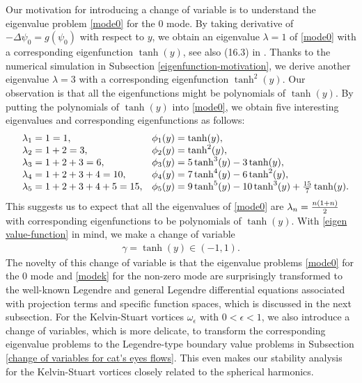 \documentclass[1 [leqno, 11pt]{amsart}
\numberwithin{equation}{section}
\begin{document}
\begin{CJK*}{GBK}{song}
Our motivation for introducing a change of variable is to understand the eigenvalue problem \eqref{mode0} for the $0$ mode.
By taking derivative of $-\Delta\psi_0=g(\psi_0)$ with respect to $y$, we obtain an eigenvalue $\lambda=1$ of \eqref{mode0} with a corresponding eigenfunction $\tanh(y)$, see also (16.3) in \cite{Laugesen2011}.
Thanks to the numerical simulation in Subsection \ref{eigenfunction-motivation}, we derive another eigenvalue $\lambda=3$ with a corresponding eigenfunction $\tanh^2(y)$.
Our observation is that all the eigenfunctions might be polynomials of $\tanh(y)$.
By putting the  polynomials of $\tanh(y)$ into \eqref{mode0}, we obtain five interesting eigenvalues and corresponding eigenfunctions as follows:
\begin{equation}\label{eigen value-function}\begin{aligned}\begin{array}{llll}
&\lambda_1=1=1, &\phi_1(y)=\tanh(y),\\
&\lambda_2=1+2=3, &\phi_2(y)=\tanh^2(y),\\
&\lambda_3=1+2+3=6, &\phi_3(y)=5\tanh^3(y)-3\tanh(y),\\
&\lambda_4=1+2+3+4=10, &\phi_4(y)=7\tanh^4(y)-6\tanh^2(y),\\
&\lambda_5=1+2+3+4+5=15, &\phi_5(y)=9\tanh^5(y)-10\tanh^3(y)+{15\over7}\tanh(y).
\end{array}
\end{aligned}
\end{equation}
This suggests us to  expect  that all the eigenvalues of \eqref{mode0} are $\lambda_n={n(1+n)\over2}$   with corresponding eigenfunctions  to be   polynomials of $\tanh(y)$.
With \eqref{eigen value-function} in mind, we  make a change of variable
\begin{align}\label{change of variable for 0 mode}\gamma = \tanh(y) \in (-1, 1).\end{align}
The novelty of this change of variable is that the eigenvalue problems  \eqref{mode0} for the $0$ mode and \eqref{modek} for the non-zero mode are surprisingly transformed to the well-known Legendre and general Legendre differential equations associated with  projection terms and specific function spaces, which is discussed in the next subsection. For the Kelvin-Stuart vortices $\omega_\epsilon$ with $0<\epsilon<1$, we also introduce a  change of variables, which is more delicate, to transform the corresponding eigenvalue problems to the  Legendre-type boundary value problems in Subsection \ref{change of variables for cat's eyes  flows}. This even makes our stability analysis for the Kelvin-Stuart vortices  closely related to the spherical harmonics.


\end{CJK*}
\end{document}
